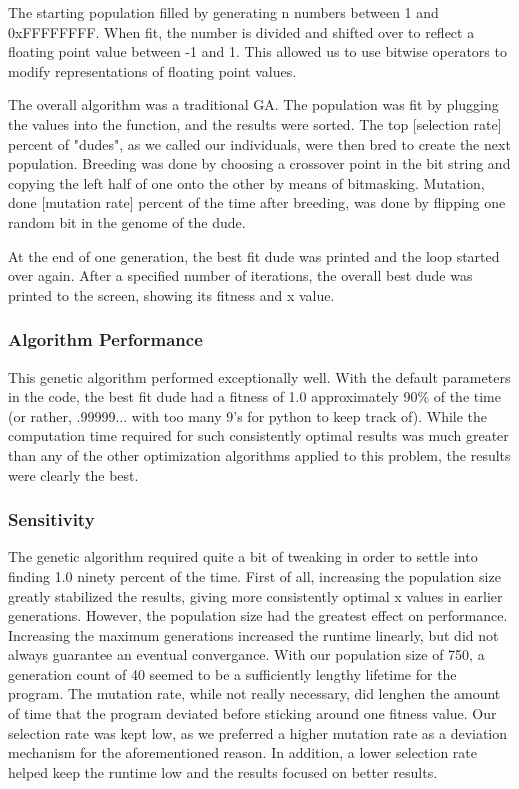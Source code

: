 The starting population filled by generating n numbers between 1 and 0xFFFFFFFF.  When fit, the number is divided and shifted over to reflect a floating point value between -1 and 1.   This allowed us to use bitwise operators to modify representations of floating point values.

The overall algorithm was a traditional GA.  The population was fit by plugging the values into the function, and the results were sorted.  The top [selection rate] percent of "dudes", as we called our individuals, were then bred to create the next population.  Breeding was done by choosing a crossover point in the bit string and copying the left half of one onto the other by means of bitmasking.  Mutation, done [mutation rate] percent of the time after breeding, was done by flipping one random bit in the genome of the dude.

At the end of one generation, the best fit dude was printed and the loop started over again.  After a specified number of iterations, the overall best dude was printed to the screen, showing its fitness and x value.

\subsubsection{Algorithm Performance}

This genetic algorithm performed exceptionally well.  With the default parameters in the code, the best fit dude had a fitness of 1.0 approximately 90\% of the time (or rather, .99999... with too many 9's for python to keep track of).  While the computation time required for such consistently optimal results was much greater than any of the other optimization algorithms applied to this problem, the results were clearly the best.

\subsubsection{Sensitivity}

The genetic algorithm required quite a bit of tweaking in order to settle into finding 1.0 ninety percent of the time.  First of all, increasing the population size greatly stabilized the results, giving more consistently optimal x values in earlier generations.  However, the population size had the greatest effect on performance.  Increasing the maximum generations increased the runtime linearly, but did not always guarantee an eventual convergance.  With our population size of 750, a generation count of 40 seemed to be a sufficiently lengthy lifetime for the program.  The mutation rate, while not really necessary, did lenghen the amount of time that the program deviated before sticking around one fitness value.  Our selection rate was kept low, as we preferred a higher mutation rate as a deviation mechanism for the aforementioned reason.  In addition, a lower selection rate helped keep the runtime low and the results focused on better results.

